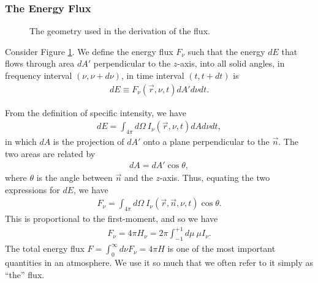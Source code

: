 \subsubsection{The Energy Flux}

\begin{figure}
\begin{center}
\end{center}
\caption{The geometry used in the derivation of the flux.}
\label{fig-flux}
\end{figure}

Consider Figure \ref{fig-flux}. 
We define the energy flux $F_\nu$ such that the energy $dE$ that flows through area
$dA'$ perpendicular to the $z$-axis, into all solid angles, in frequency interval $(\nu,\nu+d\nu)$, in
time interval $(t,t+dt)$ is
\begin{align}
dE \equiv F_\nu(\vec r, \nu, t) dA' d\nu dt.
\end{align}

\newslide

From the definition of
specific intensity, 
we have
\begin{align}
dE = 
\int_{4\pi}\!\!\!d\Omega\:
I_\nu(\vec r, \nu, t) dA d\nu dt,
\end{align}
in which $dA$ is the projection of $dA'$ onto a plane perpendicular to the $\vec n$. 
The two areas
are related by
\begin{align}
dA = dA' \cos\theta,
\end{align}
where $\theta$ is the angle between $\vec n$ and the
$z$-axis. Thus, equating the two expressions for $dE$, we have
\begin{align}
F_\nu = \int_{4\pi}\!\!\!d\Omega\:
I_\nu(\vec r, \vec n, \nu, t) \cos\theta.
\end{align}
This is proportional to the first-moment, and so we have
\begin{align}
F_\nu = 4\pi H_\nu =
2\pi \int_{-1}^{+1}\!\!\!d\mu\:\mu I_\nu.
\end{align}
The total energy flux $F = \int_0^\infty\!\!\!d\nu F_\nu = 4\pi H$ is
one of the most important quantities in an atmosphere. We use it so much that we often refer to it simply as ``the'' flux.

